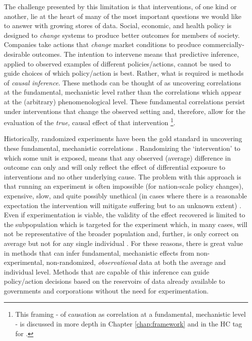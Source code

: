 \documentclass[../main.tex]{subfiles}
\begin{document}
\vspace{\baselineskip}
The challenge presented by this limitation is that interventions, of one kind or another, lie at the heart of many of the most important questions we would like to answer with growing stores of data. Social, economic, and health policy is designed to \textit{change} systems to produce better outcomes for members of society. Companies take actions that \textit{change} market conditions to produce commercially-desirable outcomes. The intention to intervene means that predictive inference, applied to observed examples of different policies/actions, cannot be used to guide choices of which policy/action is best. Rather, what is required is methods of \textit{causal inference}. These methods can be thought of as uncovering correlations at the fundamental, mechanistic level rather than the correlations which appear at the (arbitrary) phenomenological level. These fundamental correlations persist under interventions that change the observed setting and, therefore, allow for the evaluation of the \textit{true, }causal\textit{ }effect of that intervention \parencite{Scholkopf2019CausalityLearning}\footnote{This framing - of causation as correlation at a fundamental, mechanistic level - is discussed in more depth in Chapter \ref{chap:framework} and in the HC tag for .}.\par


\vspace{\baselineskip}
Historically, randomized experiments have been the gold standard in uncovering these fundamental, mechanistic correlations \parencite{Meldrum2000AStandard}. Randomizing the ‘intervention’ to which some unit is exposed, means that any observed (average) difference in outcome can only and will only reflect the effect of differential exposure to interventions and no other underlying cause. The problem with this approach is that running an experiment is often impossible (for nation-scale policy changes), expensive, slow, and quite possibly unethical (in cases where there is a reasonable expectation the intervention will mitigate suffering but to an unknown extent) \parencite{Meldrum2000AStandard}. Even if experimentation is viable, the validity of the effect recovered is limited to the subpopulation which is targeted for the experiment which, in many cases, will not be representative of the broader population and, further, is only correct on average but not for any single individual \parencite{Rothwell2006FactorsTrials}. For these reasons, there is great value in methods that can infer fundamental, mechanistic effects from non-experimental, non-randomized, \textit{observational} data at both the average and individual level. Methods that are capable of this inference can guide policy/action decisions based on the reservoirs of data already available to governments and corporations without the need for experimentation.\par
\end{document}
